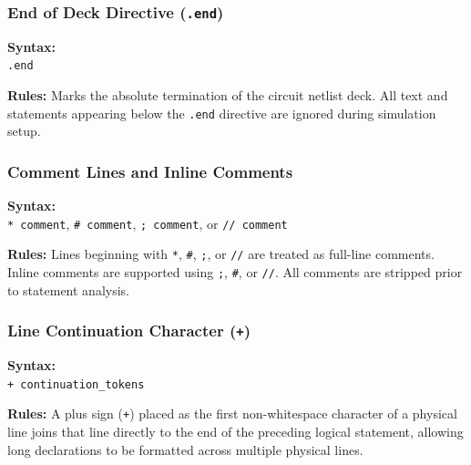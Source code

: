 \subsubsection{End of Deck Directive (\texttt{.end})}
\begin{compactitem}
    \item \textbf{Syntax:} \\
    \texttt{.end}
    \item \textbf{Rules:} Marks the absolute termination of the circuit netlist deck. All text and statements appearing below the \texttt{.end} directive are ignored during simulation setup.
\end{compactitem}

\subsubsection{Comment Lines and Inline Comments}
\begin{compactitem}
    \item \textbf{Syntax:} \\
    \texttt{* comment}, \texttt{\# comment}, \texttt{; comment}, or \texttt{// comment}
    \item \textbf{Rules:} Lines beginning with \texttt{*}, \texttt{\#}, \texttt{;}, or \texttt{//} are treated as full-line comments. Inline comments are supported using \texttt{;}, \texttt{\#}, or \texttt{//}. All comments are stripped prior to statement analysis.
\end{compactitem}

\subsubsection{Line Continuation Character (\texttt{+})}
\begin{compactitem}
    \item \textbf{Syntax:} \\
    \texttt{+ continuation\_tokens}
    \item \textbf{Rules:} A plus sign (\texttt{+}) placed as the first non-whitespace character of a physical line joins that line directly to the end of the preceding logical statement, allowing long declarations to be formatted across multiple physical lines.
\end{compactitem}


